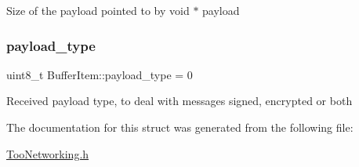 Size of the payload pointed to by void $\ast$ payload \mbox{\label{structBufferItem_a3d7529f54e1e8ffaa3ee3b85ae0ebbbd}} 
\subsubsection{\texorpdfstring{payload\+\_\+type}{payload\_type}}
{\footnotesize\ttfamily uint8\+\_\+t Buffer\+Item\+::payload\+\_\+type = 0}

Received payload type, to deal with messages signed, encrypted or both 

The documentation for this struct was generated from the following file\+:\begin{DoxyCompactItemize}
\item 
\hyperlink{TooNetworking_8h}{Too\+Networking.\+h}\end{DoxyCompactItemize}
